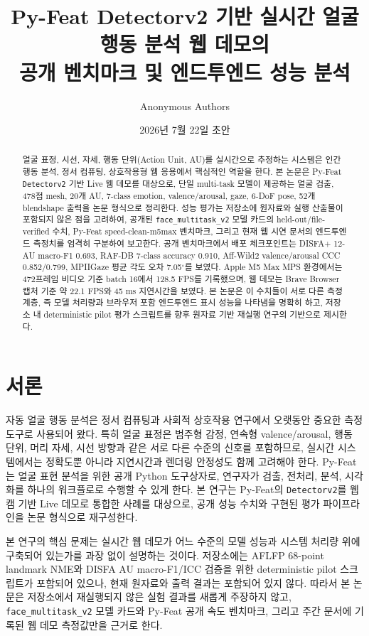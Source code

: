 \documentclass[11pt]{article}
\title{Py-Feat Detectorv2 기반 실시간 얼굴 행동 분석 웹 데모의\\공개 벤치마크 및 엔드투엔드 성능 분석}
\author{Anonymous Authors}
\date{2026년 7월 22일 초안}
\newcommand{\model}{\texttt{face\_multitask\_v2}}
\newcommand{\detector}{\texttt{Detectorv2}}
\begin{document}
\maketitle

\begin{abstract}
얼굴 표정, 시선, 자세, 행동 단위(Action Unit, AU)를 실시간으로 추정하는 시스템은 인간 행동 분석, 정서 컴퓨팅, 상호작용형 웹 응용에서 핵심적인 역할을 한다. 본 논문은 Py-Feat \detector{} 기반 Live 웹 데모를 대상으로, 단일 multi-task 모델이 제공하는 얼굴 검출, 478점 mesh, 20개 AU, 7-class emotion, valence/arousal, gaze, 6-DoF pose, 52개 blendshape 출력을 논문 형식으로 정리한다. 성능 평가는 저장소에 원자료와 실행 산출물이 포함되지 않은 점을 고려하여, 공개된 \model{} 모델 카드의 held-out/file-verified 수치, Py-Feat speed-clean-m5max 벤치마크, 그리고 현재 웹 시연 문서의 엔드투엔드 측정치를 엄격히 구분하여 보고한다. 공개 벤치마크에서 배포 체크포인트는 DISFA+ 12-AU macro-F1 0.693, RAF-DB 7-class accuracy 0.910, Aff-Wild2 valence/arousal CCC 0.852/0.799, MPIIGaze 평균 각도 오차 7.05$^\circ$를 보였다. Apple M5 Max MPS 환경에서는 472프레임 비디오 기준 batch 16에서 128.5 FPS를 기록했으며, 웹 데모는 Brave Browser 캡처 기준 약 22.1 FPS와 45 ms 지연시간을 보였다. 본 논문은 이 수치들이 서로 다른 측정 계층, 즉 모델 처리량과 브라우저 포함 엔드투엔드 표시 성능을 나타냄을 명확히 하고, 저장소 내 deterministic pilot 평가 스크립트를 향후 원자료 기반 재실행 연구의 기반으로 제시한다.
\end{abstract}

\section{서론}

자동 얼굴 행동 분석은 정서 컴퓨팅과 사회적 상호작용 연구에서 오랫동안 중요한 측정 도구로 사용되어 왔다. 특히 얼굴 표정은 범주형 감정, 연속형 valence/arousal, 행동 단위, 머리 자세, 시선 방향과 같은 서로 다른 수준의 신호를 포함하므로, 실시간 시스템에서는 정확도뿐 아니라 지연시간과 렌더링 안정성도 함께 고려해야 한다. Py-Feat는 얼굴 표현 분석을 위한 공개 Python 도구상자로, 연구자가 검출, 전처리, 분석, 시각화를 하나의 워크플로로 수행할 수 있게 한다\cite{Cheong_2023}. 본 연구는 Py-Feat의 \detector{}를 웹캠 기반 Live 데모로 통합한 사례를 대상으로, 공개 성능 수치와 구현된 평가 파이프라인을 논문 형식으로 재구성한다.

본 연구의 핵심 문제는 실시간 웹 데모가 어느 수준의 모델 성능과 시스템 처리량 위에 구축되어 있는가를 과장 없이 설명하는 것이다. 저장소에는 AFLFP 68-point landmark NME와 DISFA AU macro-F1/ICC 검증을 위한 deterministic pilot 스크립트가 포함되어 있으나, 현재 원자료와 출력 결과는 포함되어 있지 않다. 따라서 본 논문은 저장소에서 재실행되지 않은 실험 결과를 새롭게 주장하지 않고, \model{} 모델 카드와 Py-Feat 공개 속도 벤치마크, 그리고 주간 문서에 기록된 웹 데모 측정값만을 근거로 한다.
\end{document}
